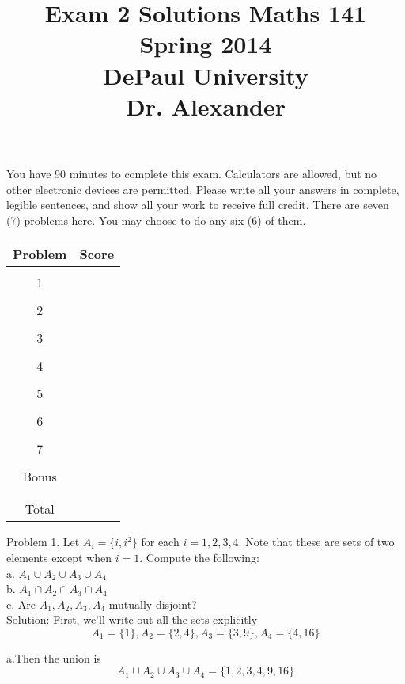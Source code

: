 \documentclass[16 pt]{amsart}
\theoremstyle{definition}
\theoremstyle{remark}
\numberwithin{equation}{subsection}
\begin{document}
\title{Exam 2 Solutions Maths 141 Spring 2014 \\ DePaul University\\Dr. Alexander}
\maketitle
You have 90 minutes to complete this exam.  Calculators are allowed, but no other electronic devices are permitted.  Please write all your answers in complete, legible sentences, and show all your work to receive full credit.  There are seven (7) problems here.  You may choose to do any six (6) of them.  
\vspace{1in}
\begin{center}
  \begin{tabular}{ c | c }
    Problem & Score\\
    \hline
    &\\
    1&\\
    &\\
    2&\\
    &\\
    3&\\
    &\\
    4&\\
    &\\
    5&\\
    &\\
    6&\\
    &\\
    7&\\
    &\\
    Bonus&\\
    &\\
    \hline 
    &\\    
    Total& 
 \end{tabular}
\end{center}

\newpage 
Problem 1. Let $A_i = \{i,i^2\}$ for each $i=1,2,3,4$.  Note that these are sets of two elements except when $i=1$. Compute the following:\\
a. $A_1\cup A_2\cup A_3\cup A_4$\\
b. $A_1\cap A_2\cap A_3\cap A_4$\\
c. Are $A_1,A_2,A_3,A_4$ mutually disjoint?\\

Solution:  First, we'll write out all the sets explicitly
\[
A_1 = \{1\}, A_2 = \{2,4\},A_3 = \{3,9\}, A_4 = \{4,16\}
\]

a.Then the union is 
\[
A_1\cup A_2\cup A_3\cup A_4 = \{1,2,3,4,9,16\}
\]
\end{document}

